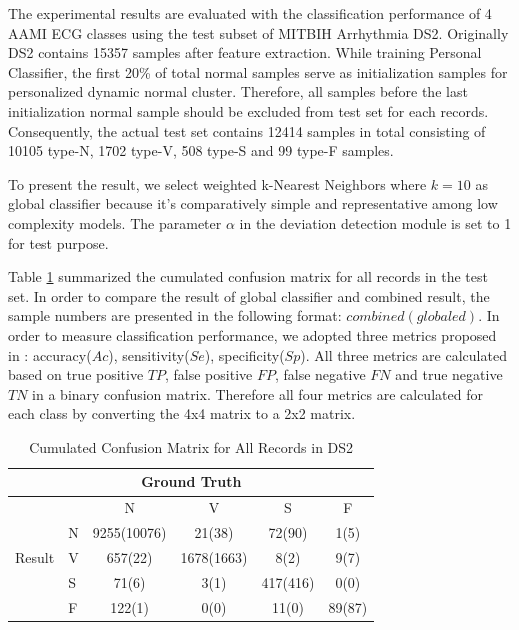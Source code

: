 {The experimental results are evaluated with the classification performance of 4 AAMI ECG classes using the test subset of MITBIH Arrhythmia DS2. Originally DS2 contains 15357 samples after feature extraction. While training Personal Classifier, the first 20\% of total normal samples serve as initialization samples for personalized dynamic normal cluster. Therefore, all samples before the last initialization normal sample should be excluded from test set for each records. Consequently, the actual test set contains 12414 samples in total consisting of 10105 type-N, 1702 type-V, 508 type-S and 99 type-F samples.

To present the result, we select weighted k-Nearest Neighbors where $k=10$ as global classifier because it's comparatively simple and representative among low complexity models. The parameter $\alpha$ in the deviation detection module is set to 1 for test purpose. 

Table \ref{table:classification_cumu} summarized the cumulated confusion matrix for all records in the test set. In order to compare the result of global classifier and combined result, the sample numbers are presented in the following format: $combined(globaled)$. In order to measure classification performance, we adopted three metrics proposed in \cite{Hu_et_al,deChazal2006,ince2009generic}: accuracy($Ac$), sensitivity($Se$), specificity($Sp$). All three metrics are calculated based on true positive $TP$, false positive $FP$, false negative $FN$ and true negative $TN$ in a binary confusion matrix. Therefore all four metrics are calculated for each class by converting the 4x4 matrix to a 2x2 matrix.

\begin{table}[t]
	\centering
	\caption{Cumulated Confusion Matrix for All Records in DS2}
	\vspace{-0.05in}
	\begin{tabular}{|l|l|c|c|c|c|}
		\hline 
		&  \multicolumn{4}{c}{Ground Truth} &\\ 
        \hline
		\multirow{5}{*}{Result} &  & N & V & S & F  \\\cline{2-6}
		& N & 9255(10076)& 21(38) & 72(90) & 1(5) \\\cline{2-6} 
		&V & 657(22) & 1678(1663) & 8(2) & 9(7)  \\\cline{2-6}
		&S & 71(6) & 3(1) & 417(416) & 0(0)  \\\cline{2-6}
        &F& 122(1) & 0(0) & 11(0) & 89(87)  \\\hline
	\end{tabular}
	\label{table:classification_cumu} 
	\vspace{-0.15in}
\end{table}

}
